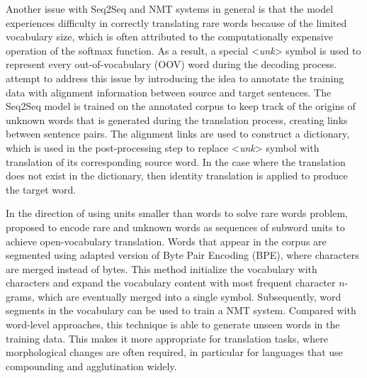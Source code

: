 \documentclass[12pt]{extarticle}
\begin{document}
Another issue with Seq2Seq and NMT systems in general is that the model experiences difficulty in correctly translating rare words because of the limited vocabulary size, which is often attributed to the computationally expensive operation of the softmax function. As a result, a special  \textless \textit{unk}\textgreater{} symbol is used to represent every out-of-vocabulary (OOV) word during the decoding process. \citep{luong-etal-2015-addressing} attempt to address this issue by introducing the idea to annotate the training data with alignment information between source and target sentences. The Seq2Seq model is trained on the annotated corpus to keep track of the origins of unknown words that is generated during the translation process, creating links between sentence pairs. The alignment links are used to construct a dictionary, which is used in the post-processing step to replace \textless \textit{unk}\textgreater{} symbol with translation of its corresponding source word. In the case where the translation does not exist in the dictionary, then identity translation is applied to produce the target word.

In the direction of using units smaller than words to solve rare words problem, \citep{sennrich-etal-2016-neural} proposed to encode rare and unknown words as sequences of subword units to achieve open-vocabulary translation. Words that appear in the corpus are segmented using adapted version of Byte Pair Encoding (BPE), where characters are merged instead of bytes. This method initialize the vocabulary with characters and expand the vocabulary content with most frequent character $n$-grams, which are eventually merged into a single symbol. Subsequently, word segments in the vocabulary can be used to train a NMT system. Compared with word-level approaches, this technique is able to generate unseen words in the training data. This makes it more appropriate for translation tasks, where morphological changes are often required, in particular for languages that use compounding and agglutination widely.
\end{document}
